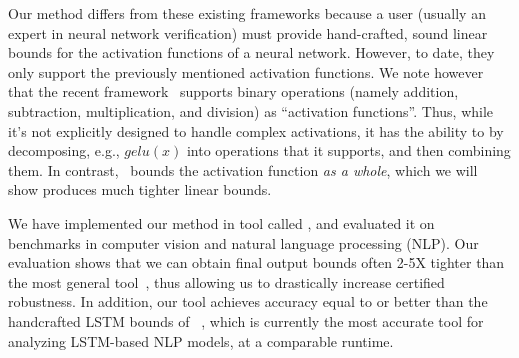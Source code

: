 Our method differs from these existing frameworks because a user (usually an
expert in neural network verification) must provide
hand-crafted, sound linear bounds for the activation functions of a
neural network.
%
%
However, to date, they only support the previously mentioned activation
functions. We note however that the recent framework~\autolipra{} supports
binary operations (namely addition, subtraction, multiplication, and division)
as ``activation functions''. Thus, while it's not explicitly designed to handle
complex
activations, it has the ability to by decomposing, e.g., $ gelu(x) $ into
operations that it supports, and then combining them. In contrast,~\Name{}
bounds the activation function \textit{as a whole}, which we will show produces
much tighter linear bounds.
%







We have implemented our method in tool called \Name{}, and evaluated it on
benchmarks in computer vision and natural language processing (NLP).
Our evaluation shows that we can obtain final output bounds often 2-5X
tighter than the most general tool~\cite{autolipra}, thus allowing us to drastically
increase certified robustness.
%
In addition, our tool achieves accuracy equal to or better
than the handcrafted LSTM bounds of \Popqorn{}~\cite{ko2019popqorn}, which is
currently the most accurate tool for analyzing LSTM-based NLP models, at a
comparable runtime.



